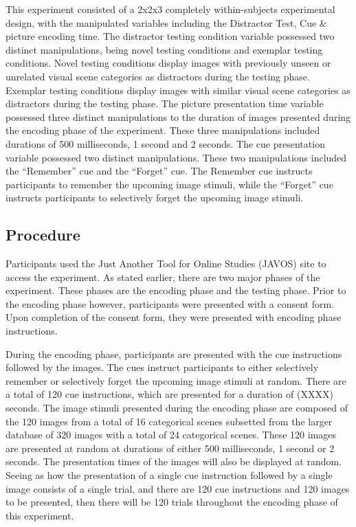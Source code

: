 \documentclass[
  english,
  man,floatsintext]{apa6}
\begin{document}
This experiment consisted of a 2x2x3 completely within-subjects experimental design, with the manipulated variables including the Distractor Test, Cue \& picture encoding time. The distractor testing condition variable possessed two distinct manipulations, being novel testing conditions and exemplar testing conditions. Novel testing conditions display images with previously unseen or unrelated visual scene categories as distractors during the testing phase. Exemplar testing conditions display images with similar visual scene categories as distractors during the testing phase. The picture presentation time variable possessed three distinct manipulations to the duration of images presented during the encoding phase of the experiment. These three manipulations included durations of 500 milliseconds, 1 second and 2 seconds. The cue presentation variable possessed two distinct manipulations. These two manipulations included the \enquote{Remember} cue and the \enquote{Forget} cue. The Remember cue instructs participants to remember the upcoming image stimuli, while the \enquote{Forget} cue instructs participants to selectively forget the upcoming image stimuli.

\hypertarget{procedure}{%
\subsection{Procedure}\label{procedure}}

Participants used the Just Another Tool for Online Studies (JAVOS) site to access the experiment. As stated earlier, there are two major phases of the experiment. These phases are the encoding phase and the testing phase. Prior to the encoding phase however, participants were presented with a consent form. Upon completion of the consent form, they were presented with encoding phase instructions.

During the encoding phase, participants are presented with the cue instructions followed by the images. The cues instruct participants to either selectively remember or selectively forget the upcoming image stimuli at random. There are a total of 120 cue instructions, which are presented for a duration of (XXXX) seconds. The image stimuli presented during the encoding phase are composed of the 120 images from a total of 16 categorical scenes subsetted from the larger database of 320 images with a total of 24 categorical scenes. These 120 images are presented at random at durations of either 500 milliseconds, 1 second or 2 seconds. The presentation times of the images will also be displayed at random. Seeing as how the presentation of a single cue instruction followed by a single image consists of a single trial, and there are 120 cue instructions and 120 images to be presented, then there will be 120 trials throughout the encoding phase of this experiment.
\end{document}
